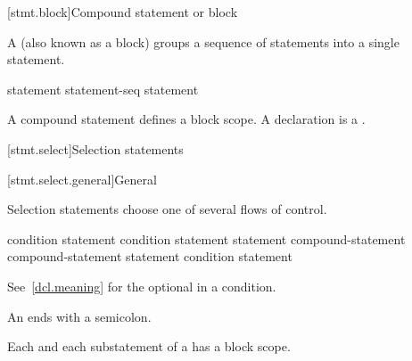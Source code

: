 [stmt.block]{Compound statement or block}%
%

\pnum
A  (also known as a block) groups a
sequence of statements into a single statement.

\begin{bnf}
\br
    \terminal{\{}  \terminal{\}}
\end{bnf}

\begin{bnf}
\br
    statement\br
    statement-seq statement
\end{bnf}

\begin{note}
A compound statement defines a block scope.
A declaration is a .
\end{note}

[stmt.select]{Selection statements}%

[stmt.select.general]{General}%

\pnum
Selection statements choose one of several flows of control.

%
%
%
\begin{bnf}
\br
      \terminal{(}  condition \terminal{)} statement\br
      \terminal{(}  condition \terminal{)} statement  statement\br
     \opt{\terminal{!}}  compound-statement\br
     \opt{\terminal{!}}  compound-statement  statement\br
     \terminal{(}  condition \terminal{)} statement
\end{bnf}

See~\ref{dcl.meaning} for the optional  in a condition.
\begin{note}
An  ends with a semicolon.
\end{note}

\pnum
{}%
\begin{note}
Each  and
each substatement of a 
has a block scope.
\end{note}

